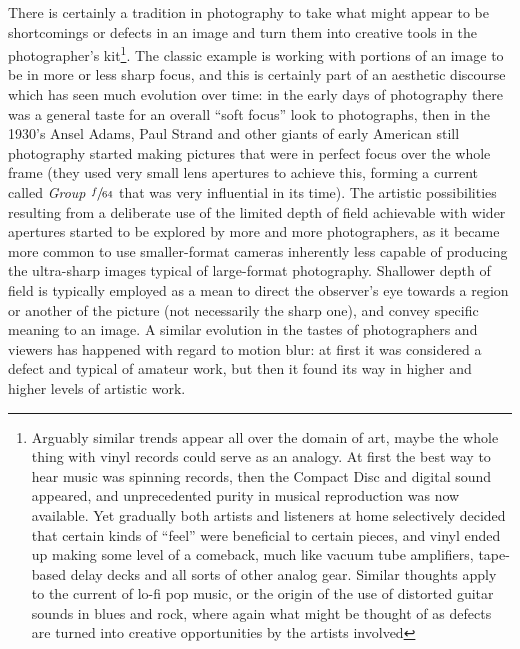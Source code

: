 There is certainly a tradition in photography to take what might appear to be shortcomings
\label{defects_as_opportunity}
or defects in an image and turn them into creative tools in the photographer's kit\footnote{
	Arguably similar trends appear all over the domain of art, maybe the whole thing with vinyl records
	could serve as an analogy. At first the best way to hear music was spinning records, then
	the Compact Disc and digital sound appeared, and unprecedented purity in musical reproduction
	was now available. Yet gradually both artists and listeners at home selectively decided that
	certain kinds of ``feel'' were beneficial to certain pieces, and vinyl ended up making some level
	of a comeback, much like vacuum tube amplifiers, tape-based delay decks and all sorts of other
	analog gear. Similar thoughts apply to the current of lo-fi pop music, or the origin of the
	use of distorted guitar sounds in blues and rock, where again what might be thought of as
	defects are turned into creative opportunities by the artists involved}.
The classic example is working with portions of an image to be in more or less sharp focus,
and this is certainly part of an aesthetic discourse which has seen much evolution over time: 
in the early days of photography there was a general taste for an overall ``soft focus'' look
to photographs, then in the 1930's Ansel Adams, Paul Strand and other giants of early American 
still photography started making pictures that were in perfect focus over the whole frame 
(they used very small lens apertures to achieve this, forming a current called 
\emph{Group $\sfrac{f}{64}$} that was very influential in its time). 
The artistic possibilities resulting from a deliberate use of the limited \gls{depth of field} 
achievable with wider \glspl{aperture} started to be explored by more and more photographers,
as it became more common to use smaller-format cameras inherently less capable of producing the
ultra-sharp images typical of large-format photography.
Shallower depth of field is typically employed as a mean to direct the observer's eye towards 
a region or another of the picture (not necessarily the sharp one), and convey specific meaning to an image. 
A similar evolution in the tastes of photographers and viewers has happened with regard to \gls{motion blur}:
at first it was considered a defect and typical of amateur work, 
but then it found its way in higher and higher levels of artistic work.

